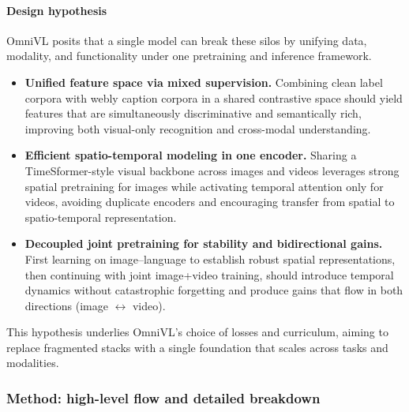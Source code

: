 \begin{enrichment}
\begin{enrichment}
        \paragraph{Design hypothesis}
        OmniVL posits that a single model can break these silos by unifying data, modality, and functionality under one pretraining and inference framework.
        \begin{itemize}
            \item \textbf{Unified feature space via mixed supervision.} Combining clean label corpora with webly caption corpora in a shared contrastive space should yield features that are simultaneously discriminative and semantically rich, improving both visual-only recognition and cross-modal understanding.
            \item \textbf{Efficient spatio-temporal modeling in one encoder.} Sharing a TimeSformer-style visual backbone across images and videos leverages strong spatial pretraining for images while activating temporal attention only for videos, avoiding duplicate encoders and encouraging transfer from spatial to spatio-temporal representation.
            \item \textbf{Decoupled joint pretraining for stability and bidirectional gains.} First learning on image–language to establish robust spatial representations, then continuing with joint image+video training, should introduce temporal dynamics without catastrophic forgetting and produce gains that flow in both directions (image \(\leftrightarrow\) video).
        \end{itemize}
        This hypothesis underlies OmniVL’s choice of losses and curriculum, aiming to replace fragmented stacks with a single foundation that scales across tasks and modalities.
        
        \subsubsection{Method: high-level flow and detailed breakdown}
        \label{subsubsec:chapter24_omnivl_method}
        

\end{enrichment}
\end{enrichment}
